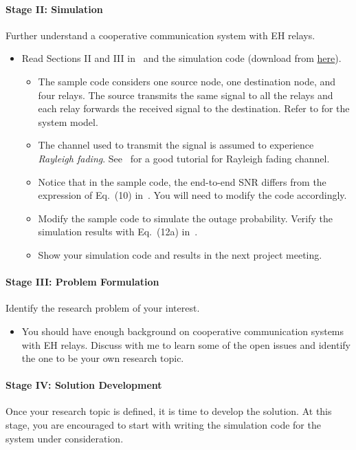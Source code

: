 \documentclass[12pt]{article}%
\begin{document}
\paragraph{Stage II: Simulation}%
Further understand a cooperative communication system with EH
relays.
\begin{itemize}
\item Read Sections II and III in~\cite{Nasir2013} and the simulation code (download from \href{https://drive.google.com/open?id=0B-ZxWv0dsZGAOGFEQ0FMWktzY28}{here}).
 \begin{itemize}
  \item The sample code considers one source node, one destination node, and four relays. The source transmits the same signal to all the relays and each relay forwards the received signal to the destination. Refer to for the system model.
  \item The channel used to transmit the signal is assumed to experience {\it Rayleigh fading}. See~\cite{RayleighFadingChannel} for a good tutorial for Rayleigh fading channel.
  \item Notice that in the sample code, the end-to-end SNR differs from the expression of Eq.~(10) in~\cite{Nasir2013}. You will need to modify the code accordingly.
  \item Modify the sample code to simulate the outage probability. Verify the simulation results with Eq.~(12a) in~\cite{Nasir2013}.
  \item Show your simulation code and results in the next project
  meeting.
    \end{itemize}
\end{itemize}

\paragraph{Stage III: Problem Formulation}%
Identify the research problem of your interest.
\begin{itemize}
\item You should have enough background on cooperative communication
systems with EH relays. Discuss with me to learn some of the open
issues and identify the one to be your own research topic.
\end{itemize}

\paragraph{Stage IV: Solution Development}%
Once your research topic is defined, it is time to develop the
solution. At this stage, you are encouraged to start with writing
the simulation code for the system under consideration.
\end{document}
